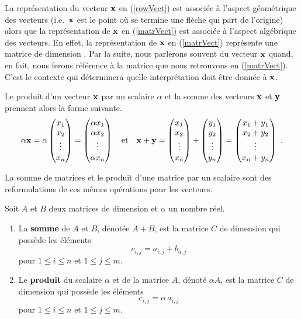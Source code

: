 {La représentation du vecteur $\mathbf{x}$ en (\ref{rowVect}) est associée
à l'aspect géométrique des vecteurs (i.e.\ $\mathbf{x}$ est le point où
se termine une flèche qui part de l'origine) alors que la représentation de
$\mathbf{x}$ en (\ref{matrVect}) est associée à l'aspect algébrique des
vecteurs.  En effet, la représentation de $\mathbf{x}$ en
(\ref{matrVect}) représente une matrice de dimension .  Par
la suite, nous parlerons souvent du vecteur $\mathbf{x}$ quand, en fait, nous
ferons référence à la matrice que nous retrouvons en (\ref{matrVect}).
C'est le contexte qui déterminera quelle interprétation doit être
donnée à $\mathbf{x}$.

Le produit d'un vecteur $\mathbf{x}$ par un scalaire $\alpha$ et la somme
des vecteurs $\mathbf{x}$ et $\mathbf{y}$ prennent alors la forme suivante.
\[
\alpha \mathbf{x} = \alpha
\begin{pmatrix} x_1 \\ x_2 \\ \vdots \\ x_n \end{pmatrix}
= \begin{pmatrix}\alpha x_1 \\ \alpha x_2 \\ \vdots \\ \alpha x_n
\end{pmatrix}
\quad \text{et}
\quad
\mathbf{x}+\mathbf{y} =
\begin{pmatrix} x_1 \\ x_2 \\ \vdots \\ x_n \end{pmatrix}
+ \begin{pmatrix} y_1 \\ y_2 \\ \vdots \\ y_n \end{pmatrix}
= \begin{pmatrix} x_1+y_1 \\ x_2+y_2 \\ \vdots \\ x_n+y_n \end{pmatrix} \ .
\]

La somme de matrices et le produit d'une matrice par un scalaire sont
des reformulations de ces mêmes opérations pour les vecteurs.

\begin{defn}
Soit $A$ et $B$ deux matrices de dimension  et $\alpha$
un nombre réel.
\begin{enumerate}
\item La {\bfseries somme} 
de $A$ et $B$, dénotée $A+B$, est la
matrice $C$ de dimension  qui possède les éléments
\[
c_{i,j} = a_{i,j} + b_{a,j}
\]
pour $1\leq i \leq n$ et $1\leq j \leq  m$.
\item Le {\bfseries produit}
du scalaire $\alpha$ et de la matrice
$A$, dénoté $\alpha A$, est la matrice $C$ de dimension 
qui possède les éléments
\[
c_{i,j} = \alpha \, a_{i,j}
\]
pour $1\leq i \leq n$ et $1\leq j \leq  m$.
\end{enumerate}
\end{defn}

}

